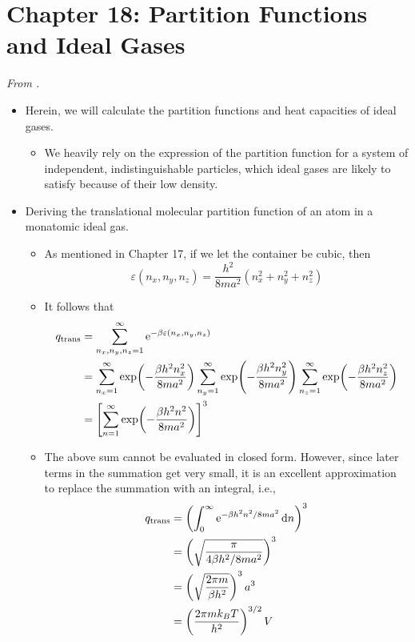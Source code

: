 \documentclass[../notes.tex]{subfiles}
\begin{document}
\section{Chapter 18: Partition Functions and Ideal Gases}
\emph{From \textcite{bib:McQuarrieSimon}.}
\begin{itemize}
    \item Herein, we will calculate the partition functions and heat capacities of ideal gases.
    \begin{itemize}
        \item We heavily rely on the expression of the partition function for a system of independent, indistinguishable particles, which ideal gases are likely to satisfy because of their low density.
    \end{itemize}
    \item Deriving the translational molecular partition function of an atom in a monatomic ideal gas.
    \begin{itemize}
        \item As mentioned in Chapter 17, if we let the container be cubic, then
        \begin{equation*}
            \varepsilon(n_x,n_y,n_z) = \frac{h^2}{8ma^2}(n_x^2+n_y^2+n_z^2)
        \end{equation*}
        \item It follows that
        \begin{align*}
            q_\text{trans} &= \sum_{n_x,n_y,n_z=1}^\infty\e[-\beta\varepsilon(n_x,n_y,n_z)]\\
            &= \sum_{n_x=1}^\infty\exp(-\frac{\beta h^2n_x^2}{8ma^2})\sum_{n_y=1}^\infty\exp(-\frac{\beta h^2n_y^2}{8ma^2})\sum_{n_z=1}^\infty\exp(-\frac{\beta h^2n_z^2}{8ma^2})\\
            &= \left[ \sum_{n=1}^\infty\exp(-\frac{\beta h^2n^2}{8ma^2}) \right]^3
        \end{align*}
        \item The above sum cannot be evaluated in closed form. However, since later terms in the summation get very small, it is an excellent approximation to replace the summation with an integral, i.e.,
        \begin{align*}
            q_\text{trans} &= \left( \int_0^\infty\e[-\beta h^2n^2/8ma^2]\dd{n} \right)^3\\
            &= \left( \sqrt{\frac{\pi}{4\beta h^2/8ma^2}} \right)^3\\
            &= \left( \sqrt{\frac{2\pi m}{\beta h^2}} \right)^3a^3\\
            &= \left( \frac{2\pi mk_BT}{h^2} \right)^{3/2}V
        \end{align*}
    \end{itemize}
\end{itemize}
\end{document}
